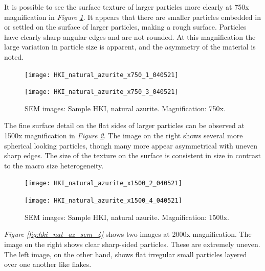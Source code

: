 It is possible to see the surface texture of larger particles more clearly at 750x magnification in \textit{Figure \ref{fig:hki_nat_az_sem_2}}. It appears that there are smaller particles embedded in or settled on the surface of larger particles, making a rough surface. Particles have clearly sharp angular edges and are not rounded. At this magnification the large variation in particle size is apparent, and the asymmetry of the material is noted.

\begin{figure}[H]
\centering
\begin{minipage}{.45\textwidth}
  \centering
  \texttt{[image: HKI\_natural\_azurite\_x750\_1\_040521]}
\end{minipage}
\begin{minipage}{.45\textwidth}
  \centering
  \texttt{[image: HKI\_natural\_azurite\_x750\_3\_040521]}
\end{minipage}
\caption[SEM images: Sample HKI, natural azurite]{SEM images: Sample HKI, natural azurite. Magnification: 750x.}
\label{fig:hki_nat_az_sem_2}
\end{figure}

The fine surface detail on the flat sides of larger particles can be observed at 1500x magnification in \textit{Figure \ref{fig:hki_nat_az_sem_3}}. The image on the right shows several more spherical looking particles, though many more appear asymmetrical with uneven sharp edges. The size of the texture on the surface is consistent in size in contrast to the macro size heterogeneity.

\begin{figure}[H]
\centering
\begin{minipage}{.45\textwidth}
  \centering
  \texttt{[image: HKI\_natural\_azurite\_x1500\_2\_040521]}
\end{minipage}
\begin{minipage}{.45\textwidth}
  \centering
  \texttt{[image: HKI\_natural\_azurite\_x1500\_4\_040521]}
\end{minipage}
\caption[SEM images: Sample HKI, natural azurite]{SEM images: Sample HKI, natural azurite. Magnification: 1500x.}
\label{fig:hki_nat_az_sem_3}
\end{figure}

\textit{Figure \ref{fig:hki_nat_az_sem_4}} shows two images at 2000x magnification. The image on the right shows clear sharp-sided particles. These are extremely uneven. The left image, on the other hand, shows flat irregular small particles layered over one another like flakes.

